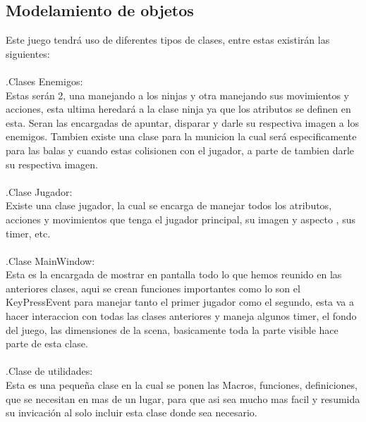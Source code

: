 \documentclass{article}
\begin{document}
\subsection{Modelamiento de objetos}
Este juego tendrá uso de diferentes tipos de clases, entre estas existirán las siguientes:\\\\
.Clases Enemigos:\\
Estas serán 2, una manejando a los ninjas y otra manejando sus movimientos y acciones, esta ultima heredará a la clase ninja ya que los atributos se definen en esta. Seran las encargadas de apuntar, disparar y darle su respectiva imagen a los enemigos. Tambien existe una clase para la municion la cual será especificamente para las balas y cuando estas colisionen con el jugador, a parte de tambien darle su respectiva imagen.\\\\
.Clase Jugador:\\
Existe una clase jugador, la cual se encarga de manejar todos los atributos, acciones y movimientos  que tenga el jugador principal, su imagen y aspecto , sus timer, etc.\\\\
.Clase MainWindow:\\
Esta es la encargada de mostrar en pantalla todo lo que hemos reunido en las anteriores clases, aqui se crean funciones importantes como lo son el KeyPressEvent para manejar tanto el primer jugador como el segundo, esta va a hacer interaccion con todas las clases anteriores y maneja algunos timer, el fondo del juego, las dimensiones de la scena, basicamente toda la parte visible hace parte de esta clase.\\\\
.Clase de utilidades:\\
Esta es una pequeña clase en la cual se ponen las Macros, funciones, definiciones, que se necesitan en mas de un lugar, para que asi sea mucho mas facil y resumida su invicación al solo incluir esta clase donde sea necesario.\\\\\\\\\\\\\\
\end{document}
